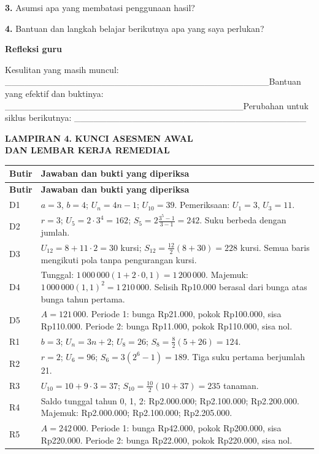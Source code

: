 \documentclass[11pt,a4paper]{article}
\begin{document}
\noindent\textbf{3.} Asumsi apa yang membatasi penggunaan hasil?\par\vspace{6mm}
\noindent\textbf{4.} Bantuan dan langkah belajar berikutnya apa yang saya perlukan?\par\vspace{6mm}
\par\medskip\noindent\textbf{Refleksi guru}\par\smallskip
{\small Kesulitan yang masih muncul: \_\_\_\_\_\_\_\_\_\_\_\_\_\_\_\_\_\_\_\_\_\_\_\_\_\_\_\_\_\_\_\_\_\_\_\_\_\_\_\_\_\newline Bantuan yang efektif dan buktinya: \_\_\_\_\_\_\_\_\_\_\_\_\_\_\_\_\_\_\_\_\_\_\_\_\_\_\_\_\_\_\_\_\_\_\_\_\_\newline Perubahan untuk siklus berikutnya: \_\_\_\_\_\_\_\_\_\_\_\_\_\_\_\_\_\_\_\_\_\_\_\_\_\_\_\_\_\_\_\_\_\_\_\_\par}\medskip
\clearpage
\begin{center}\bfseries\large LAMPIRAN 4. KUNCI ASESMEN AWAL\\[2pt] DAN LEMBAR KERJA REMEDIAL\end{center}\medskip
{\small\setlength{\tabcolsep}{2mm}\renewcommand{\arraystretch}{1.35}\begin{longtable}{|>{\raggedright\arraybackslash}p{14.685mm}|>{\raggedright\arraybackslash}p{154.865mm}|}\hline
\rowcolor{gray!10}\textbf{Butir} & \textbf{Jawaban dan bukti yang diperiksa}\\ \hline
\endfirsthead
\rowcolor{gray!10}\textbf{Butir} & \textbf{Jawaban dan bukti yang diperiksa}\\ \hline
\endhead
D1 & \(a=3\), \(b=4\); \(U_n=4n-1\); \(U_{10}=39\). Pemeriksaan: \(U_1=3\), \(U_3=11\).\\ \hline
D2 & \(r=3\); \(U_5=2\cdot3^4=162\); \(S_5=2\frac{3^5-1}{3-1}=242\). Suku berbeda dengan jumlah.\\ \hline
D3 & \(U_{12}=8+11\cdot2=30\) kursi; \(S_{12}=\frac{12}{2}(8+30)=228\) kursi. Semua baris mengikuti pola tanpa pengurangan kursi.\\ \hline
D4 & Tunggal: \(1\,000\,000(1+2\cdot0{,}1)=1\,200\,000\). Majemuk: \(1\,000\,000(1{,}1)^2=1\,210\,000\). Selisih Rp10.000 berasal dari bunga atas bunga tahun pertama.\\ \hline
D5 & \(A=121\,000\). Periode 1: bunga Rp21.000, pokok Rp100.000, sisa Rp110.000. Periode 2: bunga Rp11.000, pokok Rp110.000, sisa nol.\\ \hline
R1 & \(b=3\); \(U_n=3n+2\); \(U_8=26\); \(S_8=\frac82(5+26)=124\).\\ \hline
R2 & \(r=2\); \(U_6=96\); \(S_6=3(2^6-1)=189\). Tiga suku pertama berjumlah 21.\\ \hline
R3 & \(U_{10}=10+9\cdot3=37\); \(S_{10}=\frac{10}{2}(10+37)=235\) tanaman.\\ \hline
R4 & Saldo tunggal tahun 0, 1, 2: Rp2.000.000; Rp2.100.000; Rp2.200.000. Majemuk: Rp2.000.000; Rp2.100.000; Rp2.205.000.\\ \hline
R5 & \(A=242\,000\). Periode 1: bunga Rp42.000, pokok Rp200.000, sisa Rp220.000. Periode 2: bunga Rp22.000, pokok Rp220.000, sisa nol.\\ \hline
\end{longtable}}\medskip
\end{document}
